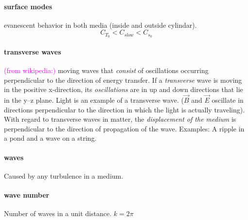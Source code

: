 \documentclass[12pt]{article}
\begin{document}
\paragraph{surface modes}
evanescent behavior in both media (inside and outside cylindar).
        $$C_{T_0} < C_{slow} < C_{s_0} $$

\paragraph{transverse waves}
\textcolor{magenta}{(from wikipedia:)}
moving waves that \emph{consist} of oscillations occurring perpendicular
to the direction of energy transfer.
If a \emph{transverse} wave is moving in the positive x-direction,
its \emph{oscillations} are in up and down directions that lie in the y–z plane.
Light is an example of a transverse wave.
($\vec B$ and $\vec E$ oscillate in directions perpendicular to the direction
in which the light is actually traveling).
With regard to transverse waves in matter,
the \emph{displacement of the medium} is perpendicular to the
direction of propagation of the wave.
Examples: A ripple in a pond and a wave on a string.

\paragraph{waves}
Caused by any turbulence in a medium.

\paragraph{wave number}
Number of waves in a unit distance.
$ k = 2\pi $
\end{document}
